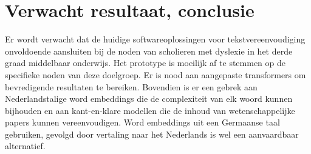 \section{Verwacht resultaat, conclusie}
\label{sec:verwachte_resultaten}


Er wordt verwacht dat de huidige softwareoplossingen voor tekstvereenvoudiging onvoldoende aansluiten bij de noden van scholieren met dyslexie in het derde graad middelbaar onderwijs. Het prototype is moeilijk af te stemmen op de specifieke noden van deze doelgroep. Er is nood aan aangepaste transformers om bevredigende resultaten te bereiken. Bovendien is er een gebrek aan Nederlandstalige word embeddings die de complexiteit van elk woord kunnen bijhouden en aan kant-en-klare modellen die de inhoud van wetenschappelijke papers kunnen vereenvoudigen. Word embeddings uit een Germaanse taal gebruiken, gevolgd door vertaling naar het Nederlands is wel een aanvaardbaar alternatief. 



